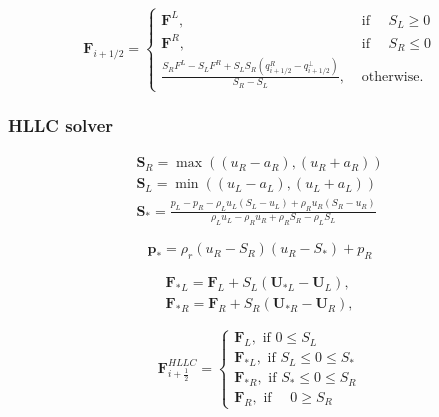 \begin{equation}
\mathbf{F}_{i+1 / 2}=\left\{\begin{array}{ll}
\mathbf{F}^{L}, & \text { if } \quad S_{L} \geqslant 0 \\
\mathbf{F}^{R}, & \text { if } \quad S_{R} \leqslant 0 \\
\frac{S_{R} F^{L}-S_{L} F^{R}+S_{L} S_{R}\left(q_{i+1 / 2}^{R}-q_{i+1 / 2}^{\perp}\right)}{S_{R}-S_{L}}, & \text { otherwise. }
\end{array}\right.
\end{equation}

\subsubsection{HLLC solver}\label{sssec:HLLC}
\begin{equation}
\begin{array}{l}
\mathbf{S}_{R}=\max \left((u_{R}-a_{R}),(u_{R}+a_{R})\right) \\
\mathbf{S}_{L}=\min \left((u_{L}-a_{L}),(u_{L}+a_{L})\right)\\
\mathbf{S}_{*}=\frac{p_L-p_R-\rho_L u_L(S_L-u_L)+\rho_R u_R(S_R-u_R)}{\rho_L u_L-\rho_Ru_R+\rho_R S_R-\rho_L S_L}
\end{array}
\end{equation}

\begin{equation}
\mathbf{p_*}=\rho_r(u_R-S_R)(u_R-S_*)+p_R
\end{equation}

\begin{equation}
\begin{array}{l}
\mathbf{F_*}_{L}=\mathbf{F}_{L}+S_{L}\left(\mathbf{U}_{* L}-\mathbf{U}_{L}\right),\\
\mathbf{F_*}_{R}=\mathbf{F}_{R}+S_{R}\left(\mathbf{U}_{* R}-\mathbf{U}_{R}\right),
\end{array}
\end{equation}

\begin{equation}
\mathbf{F}_{i+\frac{1}{2}}^{HLLC}=\left\{\begin{array}{l}
\mathbf{F}_{L}, \text { if } 0 \leq S_{L} \\
\mathbf{F}_{* L}, \text { if } S_{L} \leq 0 \leq S_{*} \\
\mathbf{F}_{* R}, \text { if } S_{*} \leq 0 \leq S_{R} \\
\mathbf{F}_{R}, \text { if } \quad 0 \geq S_{R}
\end{array}\right.
\end{equation}

